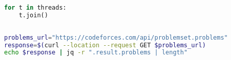 \begin{apendicesenv}
\begin{lstlisting}[language=Python, caption={Script para coletar número de problemas — Online Judge}, label={appendix:script_oj}]
for t in threads:
    t.join()
    
\end{lstlisting}

\begin{lstlisting}[caption={Script para coletar número de problemas — Codeforces}, label={appendix:script_cf}, language=bash]
problems_url="https://codeforces.com/api/problemset.problems"
response=$(curl --location --request GET $problems_url)
echo $response | jq -r ".result.problems | length"
\end{lstlisting}

\end{apendicesenv}
